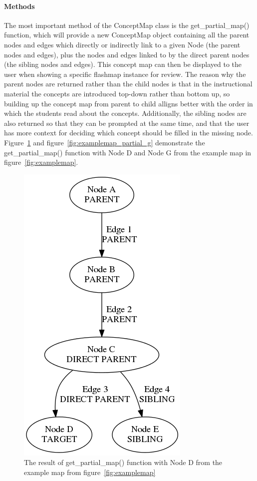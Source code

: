 \paragraph{Methods} The most important method of the ConceptMap class is the get\_partial\_map() function, which will provide a new ConceptMap object containing all the parent nodes and edges which directly or indirectly link to a given Node (the parent nodes and edges), plus the nodes and edges linked to by the direct parent nodes (the sibling nodes and edges). This concept map can then be displayed to the user when showing a specific flashmap instance for review. The reason why the parent nodes are returned rather than the child nodes is that in the instructional material the concepts are introduced top-down rather than bottom up, so building up the concept map from parent to child alligns better with the order in which the students read about the concepts. Additionally, the sibling nodes are also returned so that they can be prompted at the same time, and that the user has more context for deciding which concept should be filled in the missing node. Figure~\ref{fig:examplemap_partial_d} and figure~\ref{fig:examplemap_partial_g} demonstrate the get\_partial\_map() function with Node D and Node G from the example map in figure~\ref{fig:examplemap}.

\begin{figure}
\centering
    \includegraphics[height=.4\textheight]{img/examplemap_partial_d.png}
    \caption{The result of get\_partial\_map() function with Node D from the example map from figure~\protect\ref{fig:examplemap}}
    \label{fig:examplemap_partial_d}
\end{figure}


